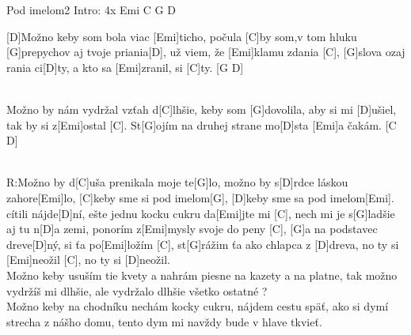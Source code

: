 \documentclass[12pt]{article}
\begin{document}
\begin{song}{Pod imelom}{2}
Intro: 4x Emi C G D

[D]Možno keby som bola viac [Emi]ticho,
počula [C]by som,v tom hluku [G]prepychov
aj tvoje priania[D], už viem, že [Emi]klamu zdania [C],
[G]slova ozaj rania ci[D]ty, a kto sa [Emi]zranil, si [C]ty. [G D]

\\
[Emi]Možno by nám vydržal vzťah d[C]lhšie,
keby som [G]dovolila, aby si mi [D]ušiel,
tak by si z[Emi]ostal [C].
St[G]ojím na druhej strane mo[D]sta [Emi]a čakám. [C D]

\\
R:Možno by d[C]uša prenikala moje te[G]lo,
možno by s[D]rdce láskou zahore[Emi]lo,
[C]keby sme si pod imelom[G],
[D]keby sme sa pod imelom[Emi].
\\
[C]cítili nájde[D]ní, 
ešte jednu kocku cukru da[Emi]jte mi [C],
\columnbreak
nech mi je s[G]ladšie aj tu n[D]a zemi,
ponorím z[Emi]mysly svoje do peny [C],
[G]a na podstavec dreve[D]ný, si ťa po[Emi]ložím [C],
st[G]rážim ťa ako chlapca z [D]dreva,
no ty si [Emi]neožil [C], no ty si [D]neožil.
\\
Možno keby usuším tie kvety
a nahrám piesne na kazety
a na platne,
tak možno vydržíš mi dlhšie,
ale vydržalo dlhšie všetko ostatné ?
\\
Možno keby na chodníku nechám
kocky cukru, nájdem cestu späť,
ako si dymí strecha z nášho domu,
tento dym mi navždy bude v hlave tkvieť.
\end{song}
\end{document}
